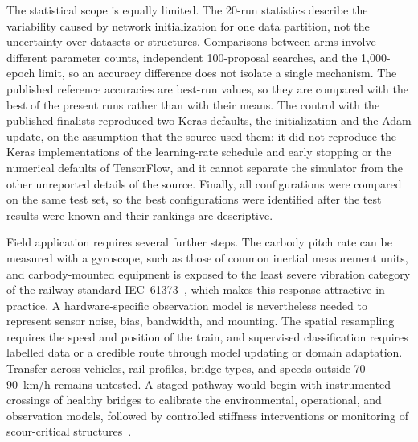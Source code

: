 The statistical scope is equally limited. The 20-run statistics describe the
variability caused by network initialization for one data partition, not the
uncertainty over datasets or structures. Comparisons between arms involve
different parameter counts, independent 100-proposal searches, and the
1,000-epoch limit, so an accuracy difference does not isolate a single
mechanism. The published reference accuracies are best-run values, so they
are compared with the best of the present runs rather than with their means.
The control with the published finalists reproduced two Keras defaults, the
initialization and the Adam update, on the assumption that the source used
them; it did not reproduce the Keras implementations of the learning-rate
schedule and early stopping or the numerical defaults of TensorFlow, and it
cannot separate the simulator from the other unreported details of the source.
Finally, all configurations were compared on the same test set, so the best
configurations were identified after the test results were known and their
rankings are descriptive.

Field application requires several further steps. The carbody pitch rate can be
measured with a gyroscope, such as those of common inertial measurement units,
and carbody-mounted equipment is exposed to the least severe vibration category
of the railway standard IEC~61373~\cite{en61373}, which makes this response
attractive in practice. A hardware-specific observation model is nevertheless
needed to represent sensor noise, bias, bandwidth, and mounting. The spatial
resampling requires the speed and position of the train, and supervised
classification requires labelled data or a credible route through model
updating or domain adaptation. Transfer across vehicles, rail profiles, bridge
types, and speeds outside 70--90~km/h remains untested. A staged pathway would
begin with instrumented crossings of healthy bridges to calibrate the
environmental, operational, and observation models, followed by controlled
stiffness interventions or monitoring of scour-critical
structures~\cite{malekjafarian2015review, fernandes2026canelas}.
